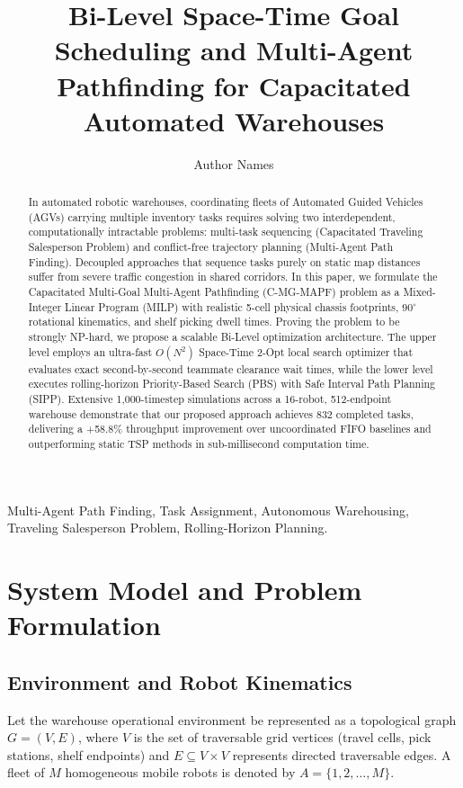 \documentclass[journal]{IEEEtran}
\begin{document}
\title{Bi-Level Space-Time Goal Scheduling and Multi-Agent Pathfinding for Capacitated Automated Warehouses}

\author{Author Names}

\maketitle

\begin{abstract}
In automated robotic warehouses, coordinating fleets of Automated Guided Vehicles (AGVs) carrying multiple inventory tasks requires solving two interdependent, computationally intractable problems: multi-task sequencing (Capacitated Traveling Salesperson Problem) and conflict-free trajectory planning (Multi-Agent Path Finding). Decoupled approaches that sequence tasks purely on static map distances suffer from severe traffic congestion in shared corridors. In this paper, we formulate the Capacitated Multi-Goal Multi-Agent Pathfinding (C-MG-MAPF) problem as a Mixed-Integer Linear Program (MILP) with realistic 5-cell physical chassis footprints, $90^\circ$ rotational kinematics, and shelf picking dwell times. Proving the problem to be strongly NP-hard, we propose a scalable Bi-Level optimization architecture. The upper level employs an ultra-fast $O(N^2)$ Space-Time 2-Opt local search optimizer that evaluates exact second-by-second teammate clearance wait times, while the lower level executes rolling-horizon Priority-Based Search (PBS) with Safe Interval Path Planning (SIPP). Extensive 1,000-timestep simulations across a 16-robot, 512-endpoint warehouse demonstrate that our proposed approach achieves 832 completed tasks, delivering a +58.8\% throughput improvement over uncoordinated FIFO baselines and outperforming static TSP methods in sub-millisecond computation time.
\end{abstract}

\begin{IEEEkeywords}
Multi-Agent Path Finding, Task Assignment, Autonomous Warehousing, Traveling Salesperson Problem, Rolling-Horizon Planning.
\end{IEEEkeywords}

\section{System Model and Problem Formulation}

\subsection{Environment and Robot Kinematics}
Let the warehouse operational environment be represented as a topological graph $G = (V, E)$, where $V$ is the set of traversable grid vertices (travel cells, pick stations, shelf endpoints) and $E \subseteq V \times V$ represents directed traversable edges. A fleet of $M$ homogeneous mobile robots is denoted by $A = \{1, 2, \dots, M\}$.
\end{document}
